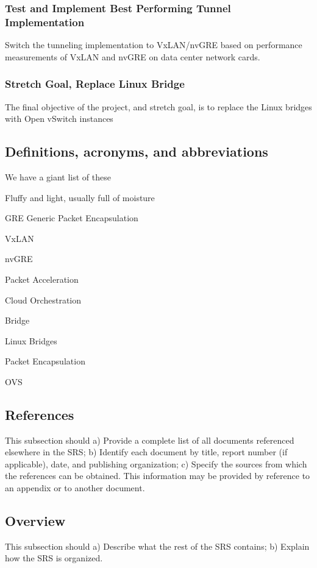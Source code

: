 \documentclass[10pt,letterpaper,onecolumn,draftclsnofoot]{IEEEtran}
\begin{document}
\subsubsection{Test and Implement Best Performing Tunnel Implementation}
Switch the tunneling implementation to VxLAN/nvGRE based on performance measurements of VxLAN and nvGRE
on data center network cards.
\subsubsection{Stretch Goal, Replace Linux Bridge}
The final objective of the project, and stretch goal, is to replace the Linux bridges with Open
vSwitch instances

\subsection{Definitions, acronyms, and abbreviations}
We have a giant list of these
\begin{description}
    \item[Cloud] Fluffy and light, usually full of moisture
    \item[Open vSwitch]
    \item[Tunnel]
    \item{GRE} Generic Packet Encapsulation
    \item{VxLAN}
    \item{nvGRE}
    \item{Packet Acceleration}
    \item{Cloud Orchestration}
    \item{Bridge}
    \item{Linux Bridges}
    \item{Packet Encapsulation}
    \item{OVS}    
\end{description}

\subsection{References}
This subsection should
a) Provide a complete list of all documents referenced elsewhere in the SRS;
b) Identify each document by title, report number (if applicable), date, and publishing organization;
c) Specify the sources from which the references can be obtained.
This information may be provided by reference to an appendix or to another document.
\subsection{Overview}
This subsection should
a) Describe what the rest of the SRS contains;
b) Explain how the SRS is organized.
\clearpage
\end{document}
